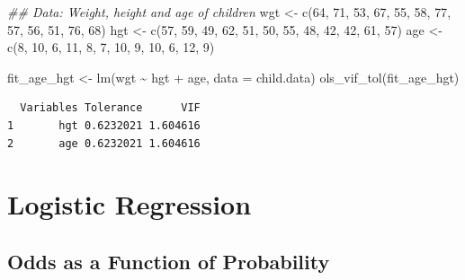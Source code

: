 \documentclass[
  letterpaper,
]{scrbook}
\newenvironment{Shaded}{\begin{snugshade}}{\end{snugshade}}
\newcommand{\AttributeTok}[1]{\textcolor[rgb]{0.40,0.45,0.13}{#1}}
\newcommand{\DecValTok}[1]{\textcolor[rgb]{0.68,0.00,0.00}{#1}}
\newcommand{\DocumentationTok}[1]{\textcolor[rgb]{0.37,0.37,0.37}{\textit{#1}}}
\newcommand{\FunctionTok}[1]{\textcolor[rgb]{0.28,0.35,0.67}{#1}}
\newcommand{\NormalTok}[1]{\textcolor[rgb]{0.00,0.23,0.31}{#1}}
\newcommand{\OtherTok}[1]{\textcolor[rgb]{0.00,0.23,0.31}{#1}}
\newcommand{\SpecialCharTok}[1]{\textcolor[rgb]{0.37,0.37,0.37}{#1}}
\begin{document}
\begin{Shaded}
\begin{Highlighting}[]
\DocumentationTok{\#\# Data: Weight, height and age of children}
\NormalTok{wgt }\OtherTok{\textless{}{-}} \FunctionTok{c}\NormalTok{(}\DecValTok{64}\NormalTok{, }\DecValTok{71}\NormalTok{, }\DecValTok{53}\NormalTok{, }\DecValTok{67}\NormalTok{, }\DecValTok{55}\NormalTok{, }\DecValTok{58}\NormalTok{, }\DecValTok{77}\NormalTok{, }\DecValTok{57}\NormalTok{, }\DecValTok{56}\NormalTok{, }\DecValTok{51}\NormalTok{, }\DecValTok{76}\NormalTok{, }\DecValTok{68}\NormalTok{)}
\NormalTok{hgt }\OtherTok{\textless{}{-}} \FunctionTok{c}\NormalTok{(}\DecValTok{57}\NormalTok{, }\DecValTok{59}\NormalTok{, }\DecValTok{49}\NormalTok{, }\DecValTok{62}\NormalTok{, }\DecValTok{51}\NormalTok{, }\DecValTok{50}\NormalTok{, }\DecValTok{55}\NormalTok{, }\DecValTok{48}\NormalTok{, }\DecValTok{42}\NormalTok{, }\DecValTok{42}\NormalTok{, }\DecValTok{61}\NormalTok{, }\DecValTok{57}\NormalTok{)}
\NormalTok{age }\OtherTok{\textless{}{-}} \FunctionTok{c}\NormalTok{(}\DecValTok{8}\NormalTok{, }\DecValTok{10}\NormalTok{, }\DecValTok{6}\NormalTok{, }\DecValTok{11}\NormalTok{, }\DecValTok{8}\NormalTok{, }\DecValTok{7}\NormalTok{, }\DecValTok{10}\NormalTok{, }\DecValTok{9}\NormalTok{, }\DecValTok{10}\NormalTok{, }\DecValTok{6}\NormalTok{, }\DecValTok{12}\NormalTok{, }\DecValTok{9}\NormalTok{)}

\NormalTok{fit\_age\_hgt }\OtherTok{\textless{}{-}} \FunctionTok{lm}\NormalTok{(wgt }\SpecialCharTok{\textasciitilde{}}\NormalTok{ hgt }\SpecialCharTok{+}\NormalTok{ age, }\AttributeTok{data =}\NormalTok{ child.data)}
\FunctionTok{ols\_vif\_tol}\NormalTok{(fit\_age\_hgt)}
\end{Highlighting}
\end{Shaded}

\begin{verbatim}
  Variables Tolerance      VIF
1       hgt 0.6232021 1.604616
2       age 0.6232021 1.604616
\end{verbatim}


\chapter{Logistic Regression}\label{logistic-regression}

\section{Odds as a Function of
Probability}\label{odds-as-a-function-of-probability}
\end{document}
